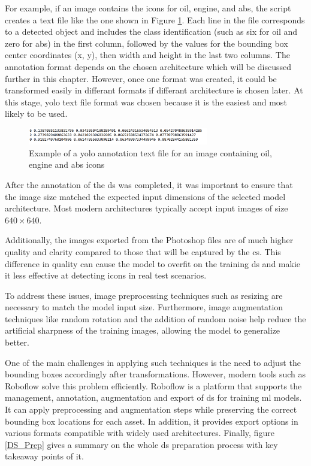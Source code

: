 For example, if an image contains the icons for oil, engine, and \gls{abs}, the script creates a text file like the one shown in Figure \ref{oil_engine_abs_txt}. Each line in the file corresponds to a detected object and includes the class identification (such as six for oil and zero for \gls{abs}) in the first column, followed by the values for the bounding box center coordinates (x, y), then width and height in the last two columns. The annotation format depends on the chosen architecture which will be discussed further in this chapter. However, once one format was created, it could be transformed easily in differant formats if differant architecture is chosen later. At this stage, \gls{yolo} text file format was chosen because it is the easiest and most likely to be used.

\begin{figure}[!h]
    \centering
    \includegraphics[width=0.7\textwidth]{Figures/Oil_Engine_ABS.png}
    \caption{Example of a \gls{yolo} annotation text file for an image containing oil, engine and \gls{abs} icons}
    \label{oil_engine_abs_txt}
\end{figure}

After the annotation of the \gls{ds} was completed, it was important to ensure that the image size matched the expected input dimensions of the selected model architecture. Most modern architectures typically accept input images of size $640 \times 640$.

Additionally, the images exported from the Photoshop files are of much higher quality and clarity compared to those that will be captured by the \gls{cs}. This difference in quality can cause the model to overfit on the training \gls{ds} and makie it less effective at detecting icons in real test scenarios.

To address these issues, image preprocessing techniques such as resizing are necessary to match the model input size. Furthermore, image augmentation techniques like random rotation and the addition of random noise help reduce the artificial sharpness of the training images, allowing the model to generalize better.

One of the main challenges in applying such techniques is the need to adjust the bounding boxes accordingly after transformations. However, modern tools such as Roboflow solve this problem efficiently. Roboflow is a platform that supports the management, annotation, augmentation and export of \gls{ds} for training \gls{ml} models. It can apply preprocessing and augmentation steps while preserving the correct bounding box locations for each asset. In addition, it provides export options in various formats compatible with widely used architectures. Finally, figure \ref{DS_Prep} gives a summary on the whole \gls{ds} preparation process with key takeaway points of it.

